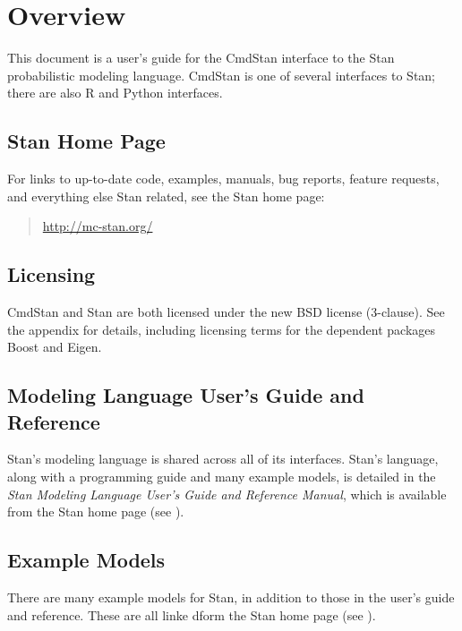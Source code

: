 \chapter{Overview}

\noindent
This document is a user's guide for the CmdStan interface to the Stan
probabilistic modeling language. CmdStan is one of several interfaces
to Stan; there are also R and Python interfaces.  

\section{Stan Home Page}\label{home-page.section}

For links to up-to-date code, examples, manuals, bug reports, feature
requests, and everything else Stan related, see the Stan home page:
%
\begin{quote}
\url{http://mc-stan.org/}
\end{quote}


\section{Licensing}

CmdStan and Stan are both licensed under the new BSD license
(3-clause). See the appendix for details, including licensing terms
for the dependent packages Boost and Eigen.


\section{Modeling Language User's Guide and Reference}

Stan's modeling language is shared across all of its interfaces.
Stan's language, along with a programming guide and many example
models, is detailed in the {\it Stan Modeling Language User's Guide
  and Reference Manual}, which is available from the Stan home page
(see ).

\section{Example Models}

There are many example models for Stan, in addition to those in the
user's guide and reference. These are all linke dform the Stan home
page (see ).





 